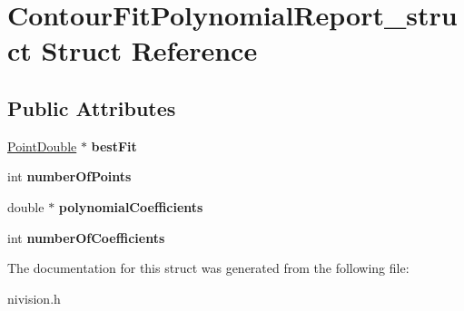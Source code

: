 \hypertarget{structContourFitPolynomialReport__struct}{
\section{ContourFitPolynomialReport\_\-struct Struct Reference}
\label{structContourFitPolynomialReport__struct}
}
\subsection*{Public Attributes}
\begin{DoxyCompactItemize}
\item 
\hypertarget{structContourFitPolynomialReport__struct_ae8745173c4fff4c0aeb9f9523f537ac3}{
\hyperlink{structPointDouble__struct}{PointDouble} $\ast$ {\bfseries bestFit}}
\label{structContourFitPolynomialReport__struct_ae8745173c4fff4c0aeb9f9523f537ac3}

\item 
\hypertarget{structContourFitPolynomialReport__struct_a90124e781068b82b20c11d9946131e30}{
int {\bfseries numberOfPoints}}
\label{structContourFitPolynomialReport__struct_a90124e781068b82b20c11d9946131e30}

\item 
\hypertarget{structContourFitPolynomialReport__struct_a1aefb580de1752c3695e82c9837a81ea}{
double $\ast$ {\bfseries polynomialCoefficients}}
\label{structContourFitPolynomialReport__struct_a1aefb580de1752c3695e82c9837a81ea}

\item 
\hypertarget{structContourFitPolynomialReport__struct_aabbfa6b48a3e3b61b031f830e61bc140}{
int {\bfseries numberOfCoefficients}}
\label{structContourFitPolynomialReport__struct_aabbfa6b48a3e3b61b031f830e61bc140}

\end{DoxyCompactItemize}


The documentation for this struct was generated from the following file:\begin{DoxyCompactItemize}
\item 
nivision.h\end{DoxyCompactItemize}
